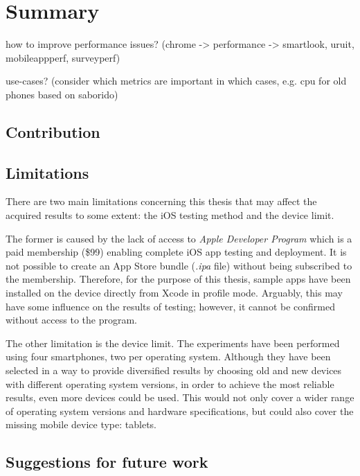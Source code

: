 
\chapter{Summary}

how to improve performance issues? (chrome -> performance -> smartlook, uruit, mobileappperf, surveyperf)

use-cases? (consider which metrics are important in which cases, e.g. cpu for old phones based on saborido)

\section{Contribution}



\section{Limitations}

There are two main limitations concerning this thesis that may affect the acquired results to some extent: the iOS testing method and the device limit.

The former is caused by the lack of access to \emph{Apple Developer Program} which is a paid membership (\$99) enabling complete iOS app testing and deployment. It is not possible to create an App Store bundle (\emph{.ipa} file) without being subscribed to the membership. Therefore, for the purpose of this thesis, sample apps have been installed on the device directly from Xcode in profile mode. Arguably, this may have some influence on the results of testing; however, it cannot be confirmed without access to the program.

The other limitation is the device limit. The experiments have been performed using four smartphones, two per operating system. Although they have been selected in a way to provide diversified results by choosing old and new devices with different operating system versions, in order to achieve the most reliable results, even more devices could be used. This would not only cover a wider range of operating system versions and hardware specifications, but could also cover the missing mobile device type: tablets.

\section{Suggestions for future work}

